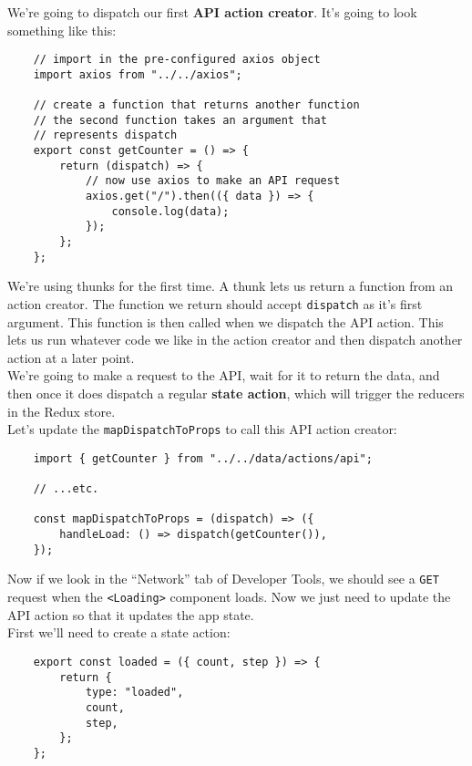 We're going to dispatch our first \textbf{API action creator}. It's going to look something like this:

\begin{verbatim}
    // import in the pre-configured axios object
    import axios from "../../axios";

    // create a function that returns another function
    // the second function takes an argument that
    // represents dispatch
    export const getCounter = () => {
        return (dispatch) => {
            // now use axios to make an API request
            axios.get("/").then(({ data }) => {
                console.log(data);
            });
        };
    };
\end{verbatim}

We're using thunks for the first time. A thunk lets us return a function from an action creator. The function we return should accept \texttt{dispatch} as it's first argument. This function is then called when we dispatch the API action. This lets us run whatever code we like in the action creator and then dispatch another action at a later point.
\\

We're going to make a request to the API, wait for it to return the data, and then once it does dispatch a regular \textbf{state action}, which will trigger the reducers in the Redux store.
\\

Let's update the \texttt{mapDispatchToProps} to call this API action creator:

\begin{verbatim}
    import { getCounter } from "../../data/actions/api";

    // ...etc.

    const mapDispatchToProps = (dispatch) => ({
        handleLoad: () => dispatch(getCounter()),
    });
\end{verbatim}

Now if we look in the ``Network'' tab of Developer Tools, we should see a \texttt{GET} request when the \texttt{<Loading>} component loads. Now we just need to update the API action so that it updates the app state.
\\

First we'll need to create a state action:

\begin{verbatim}
    export const loaded = ({ count, step }) => {
        return {
            type: "loaded",
            count,
            step,
        };
    };
\end{verbatim}

